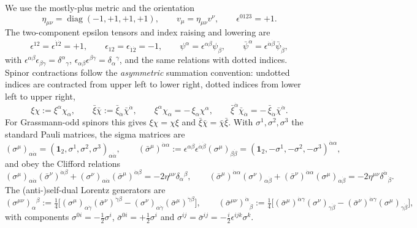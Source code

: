 We use the mostly-plus metric and the orientation
\begin{equation}
\eta_{\mu\nu}=\operatorname{diag}(-1,+1,+1,+1),\qquad
v_\mu=\eta_{\mu\nu}v^\nu,\qquad
\epsilon^{0123}=+1 .
\label{eq:2:metric}
\end{equation}
The two-component epsilon tensors and index raising and lowering are
\begin{equation}
\epsilon^{12}=\epsilon^{\dot1\dot2}=+1,\qquad
\epsilon_{12}=\epsilon_{\dot1\dot2}=-1,\qquad
\psi^\alpha=\epsilon^{\alpha\beta}\psi_\beta,\qquad
\bar\psi^{\dot\alpha}=\epsilon^{\dot\alpha\dot\beta}\bar\psi_{\dot\beta},
\label{eq:2:epsilon}
\end{equation}
with $\epsilon^{\alpha\beta}\epsilon_{\beta\gamma}=\delta^\alpha{}_\gamma$,
$\epsilon_{\alpha\beta}\epsilon^{\beta\gamma}=\delta_\alpha{}^\gamma$, and the
same relations with dotted indices. Spinor contractions follow the
\emph{asymmetric} summation convention: undotted indices are contracted from
upper left to lower right, dotted indices from lower left to upper right,
\begin{equation}
\xi\chi:=\xi^\alpha\chi_\alpha,\qquad
\bar\xi\bar\chi:=\bar\xi_{\dot\alpha}\bar\chi^{\dot\alpha},\qquad
\xi^\alpha\chi_\alpha=-\,\xi_\alpha\chi^\alpha,\qquad
\bar\xi^{\dot\alpha}\bar\chi_{\dot\alpha}
=-\,\bar\xi_{\dot\alpha}\bar\chi^{\dot\alpha}.
\label{eq:2:contraction}
\end{equation}
For Grassmann-odd spinors this gives $\xi\chi=\chi\xi$ and
$\bar\xi\bar\chi=\bar\chi\bar\xi$. With $\sigma^1,\sigma^2,\sigma^3$ the
standard Pauli matrices, the sigma matrices are
\begin{equation}
(\sigma^\mu)_{\alpha\dot\alpha}
=(\mathbf 1_2,\sigma^1,\sigma^2,\sigma^3)_{\alpha\dot\alpha},\qquad
(\bar\sigma^\mu)^{\dot\alpha\alpha}
:=\epsilon^{\alpha\beta}\epsilon^{\dot\alpha\dot\beta}
(\sigma^\mu)_{\beta\dot\beta}
=(\mathbf 1_2,-\sigma^1,-\sigma^2,-\sigma^3)^{\dot\alpha\alpha},
\label{eq:2:sigmaL}
\end{equation}
and obey the Clifford relations
\begin{equation}
(\sigma^\mu)_{\alpha\dot\alpha}(\bar\sigma^\nu)^{\dot\alpha\beta}
+(\sigma^\nu)_{\alpha\dot\alpha}(\bar\sigma^\mu)^{\dot\alpha\beta}
=-2\eta^{\mu\nu}\delta_\alpha{}^\beta,\qquad
(\bar\sigma^\mu)^{\dot\alpha\alpha}(\sigma^\nu)_{\alpha\dot\beta}
+(\bar\sigma^\nu)^{\dot\alpha\alpha}(\sigma^\mu)_{\alpha\dot\beta}
=-2\eta^{\mu\nu}\delta^{\dot\alpha}{}_{\dot\beta}.
\label{eq:2:cliffordL}
\end{equation}
The (anti-)self-dual Lorentz generators are
\begin{equation}
(\sigma^{\mu\nu})_\alpha{}^\beta
:=\tfrac14\big[(\sigma^\mu)_{\alpha\dot\gamma}(\bar\sigma^\nu)^{\dot\gamma\beta}
-(\sigma^\nu)_{\alpha\dot\gamma}(\bar\sigma^\mu)^{\dot\gamma\beta}\big],\qquad
(\bar\sigma^{\mu\nu})^{\dot\alpha}{}_{\dot\beta}
:=\tfrac14\big[(\bar\sigma^\mu)^{\dot\alpha\gamma}(\sigma^\nu)_{\gamma\dot\beta}
-(\bar\sigma^\nu)^{\dot\alpha\gamma}(\sigma^\mu)_{\gamma\dot\beta}\big],
\label{eq:2:sigmamunu}
\end{equation}
with components $\sigma^{0i}=-\tfrac12\sigma^i$,
$\bar\sigma^{0i}=+\tfrac12\sigma^i$ and
$\sigma^{ij}=\bar\sigma^{ij}=-\tfrac{i}{2}\epsilon^{ijk}\sigma^k$.

